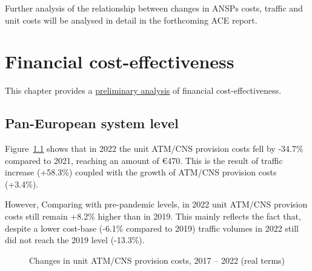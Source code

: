\documentclass[
  letterpaper,
  DIV=11,
  numbers=noendperiod]{scrreprt}
\begin{document}
Further analysis of the relationship between changes in ANSPs costs,
traffic and unit costs will be analysed in detail in the forthcoming ACE
report.


\chapter{Financial cost-effectiveness}\label{sec-financial}

This chapter provides a \ul{preliminary analysis} of financial
cost-effectiveness.

\section{Pan-European system level}\label{sec-fin_1}

Figure~\ref{fig-figure-4-1} shows that in 2022 the unit ATM/CNS
provision costs fell by -34.7\% compared to 2021, reaching an amount of
€470. This is the result of traffic increase (+58.3\%) coupled with the
growth of ATM/CNS provision costs (+3.4\%).

However, Comparing with pre-pandemic levels, in 2022 unit ATM/CNS
provision costs still remain +8.2\% higher than in 2019. This mainly
reflects the fact that, despite a lower cost-base (-6.1\% compared to
2019) traffic volumes in 2022 still did not reach the 2019 level
(-13.3\%).

\begin{figure}


\caption{\label{fig-figure-4-1}Changes in unit ATM/CNS provision costs,
2017 -- 2022 (real terms)}

\end{figure}%
\end{document}
